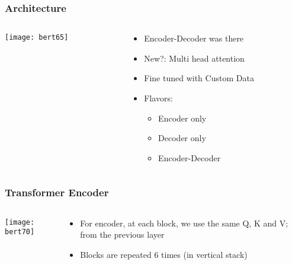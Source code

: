 \begin{frame}[fragile]\frametitle{Architecture}

\begin{columns}
    \begin{column}[T]{0.5\linewidth}
			\begin{center}
			\texttt{[image: bert65]}
			\end{center}		
		\end{column}
    \begin{column}[T]{0.5\linewidth}
      \begin{itemize}
			\item Encoder-Decoder was there
			\item New?: Multi head attention
			\item Fine tuned with Custom Data
			\item Flavors:
      \begin{itemize}
			\item Encoder only
			\item Decoder only
			\item Encoder-Decoder
			\end{itemize}
			\end{itemize}
    \end{column}
  \end{columns}
			
\end{frame}


\begin{frame}[fragile]\frametitle{Transformer Encoder}

\begin{columns}
    \begin{column}[T]{0.5\linewidth}
			\begin{center}
			\texttt{[image: bert70]}
			\end{center}		
		\end{column}
    \begin{column}[T]{0.5\linewidth}
      \begin{itemize}
			\item For encoder, at each block, we use the same Q, K and V; from the previous layer
			\item Blocks are repeated 6 times (in vertical stack)
			\end{itemize}
    \end{column}
  \end{columns}
			
\end{frame}


